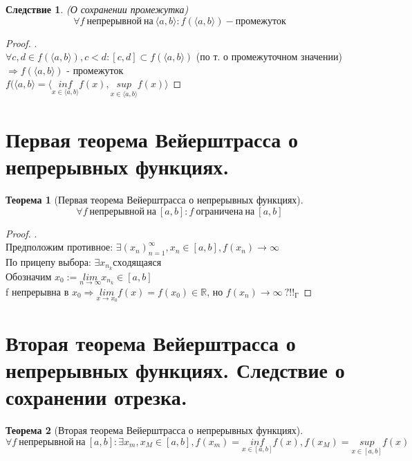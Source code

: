 \documentclass[11pt,a4paper,titlepage]{article}
\newtheorem*{theorem}{Теорема}
\newtheorem*{corollary}{Следствие}
\renewcommand{\lim}[2]{\underset{#1 \rightarrow #2}{lim}}
\renewcommand{\sup}[1]{\underset{#1}{sup}}
\renewcommand{\inf}[1]{\underset{#1}{inf}}
\newcommand{\limn}{\lim{n}{\infty}}
\renewcommand{\implies}{\Rightarrow}
\newcommand{\interval}[1]{\langle#1\rangle}
\newcommand{\sequence}[2]{(#1_#2)_{#2=1}^\infty}
\newcommand{\sequencen}[1]{\sequence{#1}{n}}
\newcommand{\R}{\mathbb{R}}
\begin{document}
    \begin{corollary}
        (О сохранении промежутка)
        \[\forall f\ непрерывной\ на\ \interval{a,b}: f(\interval{a,b}) - промежуток\]
    \end{corollary}

    \begin{proof}
        .\\
        $\forall c, d \in f(\interval{a,b}), c < d: [c, d] \subset f(\interval{a,b})$ (по т. о промежуточном значении) $\implies f(\interval{a,b})$ - промежуток\\
        $f(\interval{a,b} = \interval{\inf{x\in\interval{a,b}}f(x),\sup{x\in\interval{a,b}}f(x)}$
    \end{proof}


    \section{Первая теорема Вейерштрасса о непрерывных функциях.}

    \begin{theorem}[Первая теорема Вейерштрасса о непрерывных функциях]
        \[\forall f\ непрерывной\ на\ [a, b]: f\ ограничена\ на\ [a,b]\]
    \end{theorem}
    \begin{proof}
        .\\
        Предположим противное: $\exists \sequencen{x}, x_n \in [a, b], f(x_n) \to \infty$\\
        По прицепу выбора: $\exists x_{n_k} сходящаяся$\\
        Обозначим $x_0 := \limn x_{n_k} \in [a,b]$\\
        f непрерывна в $x_0 \implies \lim{x}{x_0}f(x) = f(x_0) \in \R$, но $f(x_n) \to \infty\ ?!!_Г$
    \end{proof}


    \section{Вторая теорема Вейерштрасса о непрерывных функциях. Следствие о сохранении отрезка.}

    \begin{theorem}[Вторая теорема Вейерштрасса о непрерывных функциях]
        \[\forall f\ непрерывной\ на\ [a,b]: \exists x_m, x_M \in [a,b], f(x_m) = \inf{x\in[a,b]}f(x), f(x_M) = \sup{x\in[a,b]}f(x)\]
    \end{theorem}
\end{document}

